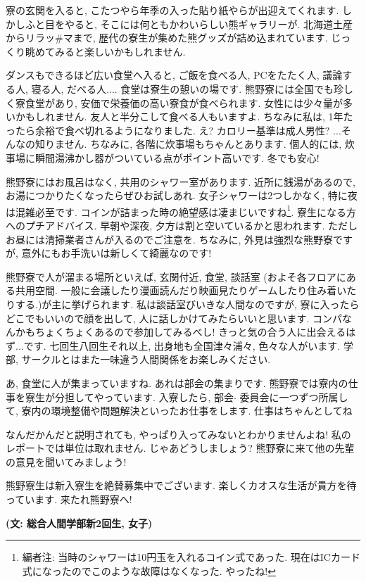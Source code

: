 \documentclass[10pt,b5jsbook,dvips,dvipdfmx,openany]{jsbook}
\theoremstyle{definition}
\begin{document}
		寮の玄関を入ると, こたつやら年季の入った貼り紙やらが出迎えてくれます. しかしふと目をやると, そこには何ともかわいらしい熊ギャラリーが. 北海道土産からリラッ\#マまで, 歴代の寮生が集めた熊グッズが詰め込まれています. じっくり眺めてみると楽しいかもしれません.

		ダンスもできるほど広い食堂へ入ると, ご飯を食べる人, PCをたたく人, 議論する人, 寝る人, だべる人.... 食堂は寮生の憩いの場です. 熊野寮には全国でも珍しく寮食堂があり, 安価で栄養価の高い寮食が食べられます. 女性には少々量が多いかもしれません. 友人と半分こして食べる人もいますよ. ちなみに私は, 1年たったら余裕で食べ切れるようになりました. え? カロリー基準は成人男性? ...そんなの知りません. ちなみに, 各階に炊事場もちゃんとあります. 個人的には, 炊事場に瞬間湯沸かし器がついている点がポイント高いです. 冬でも安心!

		熊野寮にはお風呂はなく, 共用のシャワー室があります. 近所に銭湯があるので, お湯につかりたくなったらぜひお試しあれ. 女子シャワーは2つしかなく, 特に夜は混雑必至です. コインが詰まった時の絶望感は凄まじいですね\footnote{編者注: 当時のシャワーは10円玉を入れるコイン式であった. 現在はICカード式になったのでこのような故障はなくなった. やったね!}. 寮生になる方へのプチアドバイス. 早朝や深夜, 夕方は割と空いているかと思われます. ただしお昼には清掃業者さんが入るのでご注意を. ちなみに, 外見は強烈な熊野寮ですが, 意外にもお手洗いは新しくて綺麗なのです!

		熊野寮で人が溜まる場所といえば, 玄関付近, 食堂, 談話室 (およそ各フロアにある共用空間. 一般に会議したり漫画読んだり映画見たりゲームしたり住み着いたりする.)が主に挙げられます. 私は談話室びいきな人間なのですが, 寮に入ったらどこでもいいので顔を出して, 人に話しかけてみたらいいと思います. コンパなんかもちょくちょくあるので参加してみるべし!  きっと気の合う人に出会えるはず...です. 七回生八回生それ以上, 出身地も全国津々浦々, 色々な人がいます. 学部, サークルとはまた一味違う人間関係をお楽しみください.

		あ, 食堂に人が集まっていますね. あれは部会の集まりです. 熊野寮では寮内の仕事を寮生が分担してやっています. 入寮したら, 部会$ \cdot $ 委員会に一つずつ所属して, 寮内の環境整備や問題解決といったお仕事をします. 仕事はちゃんとしてね

		なんだかんだと説明されても, やっぱり入ってみないとわかりませんよね!  私のレポートでは単位は取れません. じゃあどうしましょう?  熊野寮に来て他の先輩の意見を聞いてみましょう!

		熊野寮生は新入寮生を絶賛募集中でございます. 楽しくカオスな生活が貴方を待っています. 来たれ熊野寮へ!

{\bf (文: 総合人間学部新2回生, 女子)}
\end{document}
